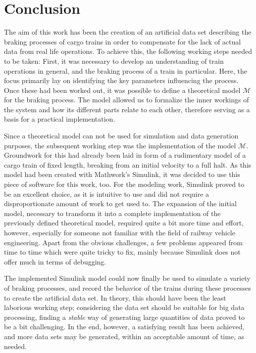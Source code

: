 \chapter{Conclusion}
\label{chap:Conclusion}
\par\noindent
The aim of this work has been the creation of an artificial data set describing the braking processes of cargo trains in order to compensate for the lack of actual data from real life operations. To achieve this, the following working steps needed to be taken: First, it was necessary to develop an understanding of train operations in general, and the braking process of a train in particular. Here, the focus primarily lay on identifying the key parameters influencing the process. Once these had been worked out, it was possible to define a theoretical model ${\mathcal{M}}$ for the braking process. The model allowed us to formalize the inner workings of the system and how its different parts relate to each other, therefore serving as a basis for a practical implementation.
\par
Since a theoretical model can not be used for simulation and data generation purposes, the subsequent working step was the implementation of the model ${\mathcal{M}}$. Groundwork for this had already been laid in form of a rudimentary model of a cargo train of fixed length, breaking from an initial velocity to a full halt. As this model had been created with Mathwork's Simulink, it was decided to use this piece of software for this work, too. For the modeling work, Simulink proved to be an excellent choice, as it is intuitive to use and did not require a disproportionate amount of work to get used to. The expansion of the initial model, necessary to transform it into a complete implementation of the previously defined theoretical model, required quite a bit more time and effort, however, especially for someone not familiar with the field of railway vehicle engineering. Apart from the obvious challenges, a few problems appeared from time to time which were quite tricky to fix, mainly because Simulink does not offer much in terms of debugging.
\par
The implemented Simulink model could now finally be used to simulate a variety of braking processes, and record the behavior of the trains during these processes to create the artificial data set. In theory, this should have been the least laborious working step; considering the data set should be suitable for big data processing, finding a \textit{stable} way of generating large quantities of data proved to be a bit challenging. In the end, however, a satisfying result has been achieved, and more data sets may be generated, within an acceptable amount of time, as needed.
